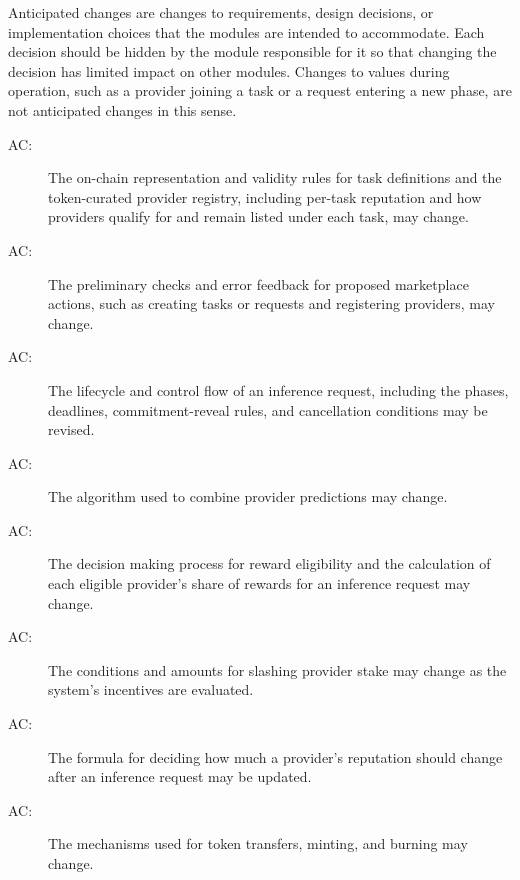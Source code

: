 \documentclass[12pt, titlepage]{article}
\newcounter{acnum}
\newcommand{\actheacnum}{AC\theacnum}
\begin{document}
Anticipated changes are changes to requirements, design decisions, or implementation choices that the modules are intended to accommodate. Each decision should be hidden by the module responsible for it so that changing the decision has limited impact on other modules. Changes to values during operation, such as a provider joining a task or a request entering a new phase, are not anticipated changes in this sense.

\begin{description}
\item[ \actheacnum \label{acProviderRegistry}:] The on-chain representation and validity rules for task definitions and the token-curated provider registry, including per-task reputation and how providers qualify for and remain listed under each task, may change.

\item[ \actheacnum \label{acActionPreflight}:] The preliminary checks and error feedback for proposed marketplace actions, such as creating tasks or requests and registering providers, may change.

\item[ \actheacnum \label{acRequestLifecycle}:] The lifecycle and control flow of an inference request, including the phases, deadlines, commitment-reveal rules, and cancellation conditions may be revised.

\item[ \actheacnum \label{acAggregation}:] The algorithm used to combine provider predictions may change.

\item[ \actheacnum \label{acRewards}:] The decision making process for reward eligibility and the calculation of each eligible provider's share of rewards for an inference request may change.

\item[ \actheacnum \label{acPenalties}:] The conditions and amounts for slashing provider stake may change as the system's incentives are evaluated.

\item[ \actheacnum \label{acReputation}:] The formula for deciding how much a provider's reputation should change after an inference request may be updated.

\item[ \actheacnum \label{acTokenOperations}:] The mechanisms used for token transfers, minting, and burning may change.


\end{description}
\end{document}
